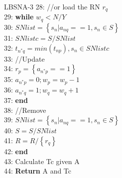 \documentclass[main.tex]{subfiles}
\begin{document}
\begin{frame}{LBSNA-3}
\footnotesize
28: \hspace{2mm}//or load the RN $r_q$\\
29: \hspace{2mm}\textbf{while} $w_q < N/Y$\\
30: \hspace{4mm}$SNlist = \left\{s_n | a_{nq} == 1, s_n \in S\right\}$\\
31: \hspace{4mm}$SNlistc = S/SNlist$\\
32: \hspace{4mm}$t_{n^*q} = min(t_{np}), s_n \in SNlistc$\\
33: \hspace{4mm}//Update\\
34: \hspace{4mm}$r_p = \left\{a_{n^*p} == 1\right\}$\\
35: \hspace{4mm}$a_{n^*p} = 0; w_p = w_p - 1$\\
36: \hspace{4mm}$a_{n^*q} = 1; w_{q} = w_{q} + 1$\\
37: \hspace{2mm}\textbf{end}\\
38: \hspace{2mm}//Remove\\
39: \hspace{2mm}$SNlist = \left\{s_n | a_{nq} == 1, s_n \in S\right\}$\\
40: \hspace{2mm}$S = S/SNlist$\\
41: \hspace{2mm}$R = R/\left\{r_q\right\}$\\
42: \textbf{end}\\
43: Calculate Tc given A\\
44: \textbf{Return} A and Tc
\end{frame}
\end{document}
